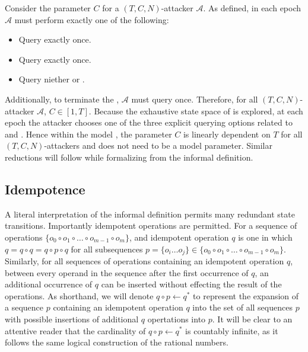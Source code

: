Consider the parameter \(C\) for a \((T, C, N)\)-attacker \(\mathcal{A}\).
As defined, in each epoch \(\mathcal{A}\) must perform exactly one of the following:

\begin{itemize}
  \item Query  exactly once.
  \item Query   exactly once.
  \item Query niether  or .
\end{itemize}

Additionally, to terminate the \CGKAsec, \(\mathcal{A}\) must query  once.
Therefore, for all \((T, C, N)\)-attacker \(\mathcal{A}\), \(C \in [1, T]\).
Because the exhaustive state space of is explored, at each epoch the attacker chooses one of the three explicit querying options related to  and .
Hence within the model , the parameter \(C\) is linearly dependent on \(T\) for all \((T, C, N)\)-attackers and does not need to be a model parameter.
Similar reductions will follow while formalizing  from the informal \CGKAsec definition.


\hypertarget{idempotence}{%
\subsection{Idempotence}\label{idempotence}}

A literal interpretation of the informal \CGKAsec definition permits many redundant state transitions.
Importantly idempotent operations are permitted.
For a sequence of operations \( \{ o_0 \circ o_{1} \circ \ldots \circ o_{m-1} \circ o_{m} \} \), and idempotent operation \(q\) is one in which \(q = q \circ q = q \circ p \circ q\) for all subsequences \(p = \{o_i \ldots o_j \} \in \{ o_0 \circ o_{1} \circ \ldots \circ o_{m-1} \circ o_{m} \} \).
Similarly, for all sequences of operations containing an idempotent operation \(q\), between every operand in the sequence after the first occurrence of \(q\), an additional occurrence of \(q\) can be inserted without effecting the result of the operations.
As shorthand, we will denote \(q \circ p \gets q^{*}\) to represent the expansion of a sequence \(p\) containing an idempotent operation \(q\) into the set of all sequences \(p\) with possible insertions of additional \(q\) opertations into \(p\).
It will be clear to an attentive reader that the cardinality of \(q \circ p \gets q^{*}\) is countably infinite, as it follows the same logical construction of the rational numbers.

